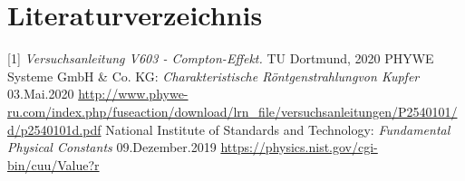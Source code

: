 \documentclass[titlepage = firstcover]{scrartcl}
\begin{document}
    \newpage
    \section{Literaturverzeichnis}
            [1] \textit{Versuchsanleitung V603 - Compton-Effekt.} TU Dortmund, 2020 \newline
            [2] PHYWE Systeme GmbH \& Co. KG: \textit{Charakteristische Röntgenstrahlungvon Kupfer} 03.Mai.2020
                \url{http://www.phywe-ru.com/index.php/fuseaction/download/lrn_file/versuchsanleitungen/P2540101/d/p2540101d.pdf} \newline
            [3] National Institute of Standards and Technology: \textit{Fundamental Physical Constants} 09.Dezember.2019
                \url{https://physics.nist.gov/cgi-bin/cuu/Value?r}

    \newpage
    
\end{document}
